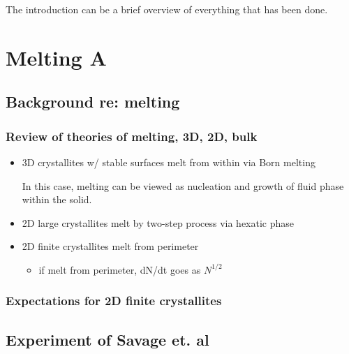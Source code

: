 \documentclass[11pt]{article}
\begin{document}
The introduction can be a brief overview of everything that has been done.

\section{Melting A}
\label{sec-2}

\subsection{Background re: melting}
\label{sec-2.1}

\subsubsection{Review of theories of melting, 3D, 2D, bulk}
\label{sec-2.1.1}

\begin{itemize}

\item 3D crystallites w/ stable surfaces melt from within via Born melting\\
\label{sec-2.1.1.1}

In this case, melting can be viewed as nucleation and growth of fluid phase within the solid.

\item 2D large crystallites melt by two-step process via hexatic phase\\
\label{sec-2.1.1.2}


\item 2D finite crystallites melt from perimeter\\
\label{sec-2.1.1.3}

\begin{itemize}

\item if melt from perimeter, dN/dt goes as $N^{1/2}$\\
\label{sec-2.1.1.3.1}

\end{itemize} %
\end{itemize} %
\subsubsection{Expectations for 2D finite crystallites}
\label{sec-2.1.2}

\subsection{Experiment of Savage et. al}
\label{sec-2.2}
\end{document}
